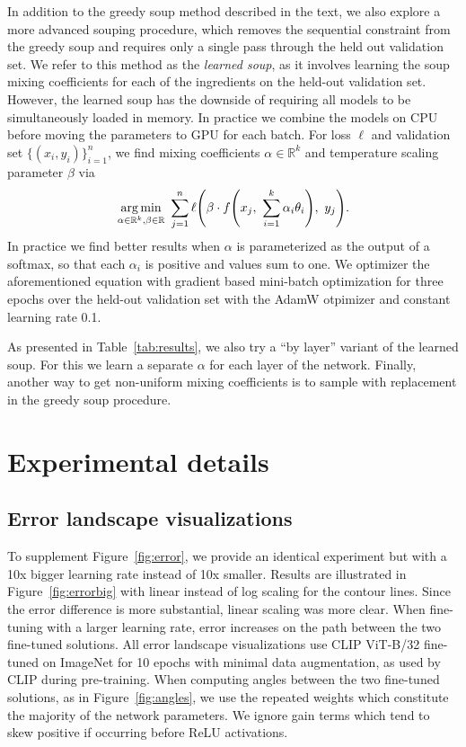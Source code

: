\documentclass[nohyperref]{article}
\DeclareMathOperator*{\argmin}{arg\,min}
\theoremstyle{plain}
\theoremstyle{definition}
\theoremstyle{remark}
\begin{document}
    In addition to the greedy soup method described in the text, we also explore a more advanced souping procedure, which removes the sequential constraint 
    from the greedy soup and requires only a single pass through the held out validation set.
    We refer to this method as the \emph{learned soup}, as it involves learning the soup mixing coefficients
    for each of the ingredients on the held-out validation set. However, the learned soup has the downside of
    requiring all models to be simultaneously loaded in memory. In practice we combine the models on
    CPU before moving the parameters to GPU for each batch.
    For loss $\ell$ and validation set $\{(x_i, y_i)\}_{i=1}^n$, we find mixing coefficients 
    $\alpha \in \mathbb{R}^k$ and temperature scaling parameter $\beta$ via
    \begin{equation}%
            \argmin_{\alpha \in \mathbb{R}^k, \beta \in \mathbb{R} } \
            \sum_{j=1}^n \ell\mleft(
            \beta \cdot f\mleft(x_j, \ \sum_{i=1}^k {\alpha}_i \theta_i \mright), \ y_j \mright).
    \end{equation}
    In practice we find better results when $\alpha$ is parameterized as the output of a softmax,
    so that each $\alpha_i$ is positive and values sum to one.
    We optimizer the aforementioned equation with gradient based mini-batch optimization for three epochs over
    the held-out validation set with the AdamW otpimizer and constant learning rate 0.1.
    
    As presented in Table~\ref{tab:results}, we also try a ``by layer'' variant
    of the learned soup. For this we learn a separate $\alpha$ for each layer of the network. Finally, another way to get non-uniform mixing coefficients is to sample with replacement in the greedy soup procedure.
    
    
    \section{Experimental details}\label{app:details}
    

    \subsection{Error landscape visualizations}\label{app:error}
    
    To supplement Figure~\ref{fig:error}, we provide an identical experiment but with a
    10x bigger learning rate instead of 10x smaller. Results are 
    illustrated in Figure~\ref{fig:errorbig} with linear instead of log scaling
    for the contour lines. Since the error difference is more substantial,
    linear scaling was more clear.
    When fine-tuning with a larger learning rate,
    error increases on the path between the two fine-tuned solutions.
    All error landscape visualizations use CLIP ViT-B/32 fine-tuned on ImageNet for 10 epochs
    with minimal data augmentation, as used by CLIP during pre-training.
    When computing angles between the two fine-tuned solutions, as in Figure~\ref{fig:angles},
    we use the repeated weights which constitute the majority of the network parameters.
    We ignore gain terms which tend to skew positive if occurring before ReLU activations.
    
\end{document}
